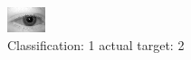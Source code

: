 \begin{figure}[h!]
\begin{center}
\includegraphics[width=0.60\columnwidth]{figures/ID482_class_1_target_2.png}
\end{center}
\caption{ Classification: 1 actual target: 2}
\label{fig:ID482_class_1_target_2}
\end{figure}
